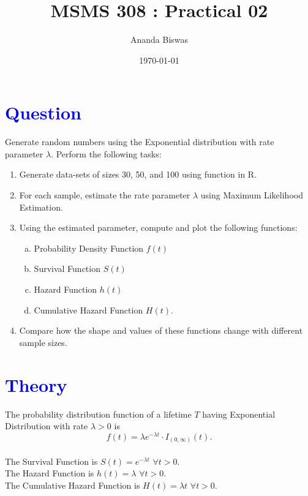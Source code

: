 \documentclass[11pt, a4paper]{article}\usepackage[]{graphicx}\usepackage[]{xcolor}
\title{MSMS 308 : Practical 02}
\author{Ananda Biswas}
\date{\today}
\begin{document}
\maketitle


\section*{\faArrowAltCircleRight[regular] \textcolor{blue}{Question}}

\hspace{1cm} Generate random numbers using the Exponential distribution with rate parameter $\lambda$. Perform the following tasks:
\begin{enumerate}
\item Generate data-sets of sizes 30, 50, and 100 using function in R.
\item For each sample, estimate the rate parameter $\lambda$ using Maximum Likelihood Estimation.
\item Using the estimated parameter, compute and plot the following functions:
  \begin{enumerate}[(a)]
  \item Probability Density Function $f(t)$
  \item Survival Function $S(t)$
  \item Hazard Function $h(t)$
  \item Cumulative Hazard Function $H(t)$.
  \end{enumerate}
\item Compare how the shape and values of these functions change with different sample sizes.
\end{enumerate}


\section*{\faArrowAltCircleRight[regular] \textcolor{blue}{Theory}}

The probability distribution function of a lifetime $T$ having Exponential Distribution with rate $\lambda > 0$ is 
$$f(t) = \lambda e^{-\lambda t} \cdot I_{(0, \infty)}(t).$$\\

The Survival Function is $S(t) = e^{-\lambda t} \,\, \forall t > 0$.\\[0.5em]

The Hazard Function is $h(t) = \lambda \,\, \forall t > 0$.\\[0.5em]

The Cumulative Hazard Function is $H(t) = \lambda t \,\, \forall t > 0$.\\[0.5em]
\end{document}
